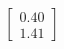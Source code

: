 \documentclass[preview]{standalone}
\begin{document}
\begin{align*}
\begin{bmatrix} 0.40 \\ 1.41 \end{bmatrix}
\end{align*}
\end{document}
